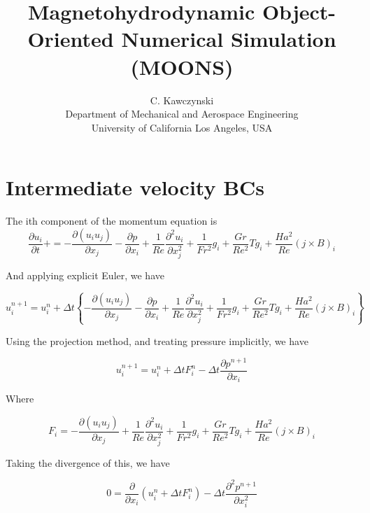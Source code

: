 \documentclass[11pt]{article}
\begin{document}
\doublespacing
\title{Magnetohydrodynamic Object-Oriented Numerical Simulation (MOONS)}
\author{C. Kawczynski \\
Department of Mechanical and Aerospace Engineering \\
University of California Los Angeles, USA\\
}
\maketitle

\section{Intermediate velocity BCs}
The ith component of the momentum equation is
\begin{equation}
	\frac{\partial u_i}{\partial t} + 
	= 
	- \frac{\partial (u_i u_j)}{\partial x_j}
	- \frac{\partial p}{\partial x_i}
	+ \frac{1}{Re}
	\frac{\partial^2 u_i}{\partial x_j^2}
	+ \frac{1}{Fr^2}
	g_i
	+ \frac{Gr}{Re^2}
	T g_i
	+ \frac{Ha^2}{Re}
	(j \times B)_i
\end{equation}

And applying explicit Euler, we have

\begin{equation}
	u_i^{n+1}
	=
	u_i^n
	+
	\Delta t
	\left\{
	- \frac{\partial (u_i u_j)}{\partial x_j}
	- \frac{\partial p}{\partial x_i}
	+ \frac{1}{Re}
	\frac{\partial^2 u_i}{\partial x_j^2}
	+ \frac{1}{Fr^2}
	g_i
	+ \frac{Gr}{Re^2}
	T g_i
	+ \frac{Ha^2}{Re}
	(j \times B)_i
	\right\}
\end{equation}

Using the projection method, and treating pressure implicitly, we have

\begin{equation}
	u_i^{n+1}
	=
	u_i^n
	+
	\Delta t
	F_i^n
	-
	\Delta t
	\frac{\partial p^{n+1}}{\partial x_i}
\end{equation}

Where

\begin{equation}
	F_i
	=
	- \frac{\partial (u_i u_j)}{\partial x_j}
	+ \frac{1}{Re}
	\frac{\partial^2 u_i}{\partial x_j^2}
	+ \frac{1}{Fr^2}
	g_i
	+ \frac{Gr}{Re^2}
	T g_i
	+ \frac{Ha^2}{Re}
	(j \times B)_i
\end{equation}

Taking the divergence of this, we have

\begin{equation}
	0
	=
	\frac{\partial }{\partial x_i}
	\left(
	u_i^n
	+
	\Delta t
	F_i^n
	\right)
	-
	\Delta t
	\frac{\partial^2 p^{n+1}}{\partial x_i^2}
\end{equation}
\end{document}
